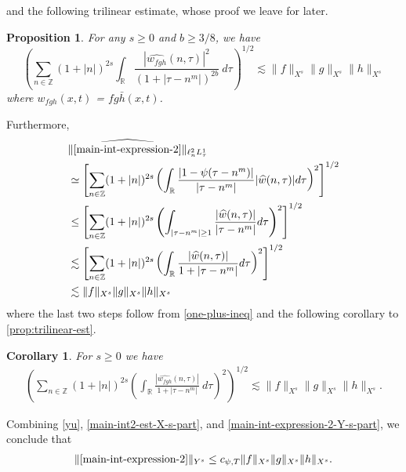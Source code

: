 \documentclass[12pt,reqno]{amsart}
\numberwithin{equation}{section}  %
\numberwithin{figure}{section}
\newcommand{\rr}{\mathbb{R}}
\newcommand{\zz}{\mathbb{Z}}
\newcommand{\wh}{\widehat}
\theoremstyle{plain}
\newtheorem{proposition}{Proposition}
\newtheorem{corollary}{Corollary}
\theoremstyle{definition}
\theoremstyle{remark}
\begin{document}
%
%
and the following trilinear estimate, whose proof we leave for later.
%
%
%
%
%
%
%
%
\begin{proposition}
\label{prop:trilinear-est}
	For any $s \ge 0$ and $b \ge 3/8$, we have
	\begin{equation}
		\left( \sum_{n \in \zz} \left (1 + |n| \right )^{2s} \int_\rr
		\frac{|\wh{w_{fgh}}(n, \tau) |^2}{\left (1+ |\tau - 
    n^{m}| \right )^{2b}} 
		 \ d \tau 
		\right)^{1/2}
		\lesssim \|f\|_{X^s} \|g\|_{X^s}\|h\|_{X^s}
	\end{equation}
	where $w_{fgh}(x,t)$ = $fg \bar h (x,t)$.
%
%
%
%
\end{proposition}
%
%
Furthermore,
%
%
%
%
\begin{equation}
	\label{main-int-expression-2-Y-s-part}
	\begin{split}
    & \| \wh{\eqref{main-int-expression-2}}\|_{\ell^{2}_{n}L^{1}_{\tau}}
		\\
    & \simeq \left[ \sum_{n \in \zz}(1 + | n |)^{2s} \left(
		\int_{\rr}\frac{|1 - \psi(\tau - n^{m})|}{|\tau - n^{m}|} |\wh{w}(n, \tau)| d
		\tau \right)^{2} \right]^{1/2}
		\\
    & \le \left[ \sum_{n \in \zz}(1 + | n |)^{2s} \left(
    \int_{| \tau - n^{m} | \ge 1 }\frac{|\wh{w}(n, \tau)|}{|\tau - n^{m}|}  d
		\tau \right)^{2} \right]^{1/2}
    \\
    & \lesssim \left[ \sum_{n \in \zz}(1 + | n |)^{2s} \left(
    \int_{\rr}\frac{|\wh{w}(n, \tau)|}{1 + |\tau - n^{m}|}  d
		\tau \right)^{2} \right]^{1/2}
    \\
		& \lesssim \|f\|_{X^s} \|g\|_{X^s}\|h\|_{X^s}
	\end{split}
\end{equation}
%
%
where the last two steps follow from \eqref{one-plus-ineq} and the following
corollary to \autoref{prop:trilinear-est}.
%
%
%
%
%
%
%
%
\begin{corollary}
\label{cor:trilinear-estimate2}
	For $s \ge 0$ we have
%
%
\begin{equation}
	\label{trilinear-estimate2}
	\begin{split}
		\left( \sum_{n \in \zz} \left (1 + |n| \right )^{2s}  \left ( \int_\rr 
		\frac{|\wh{w_{fgh}}(n, \tau) |}{1 + | \tau - n^{m } |}
		 \ d\tau \right)^2  \right)^{1/2} \lesssim \|f\|_{X^s} \|g\|_{X^s}\|h\|_{X^s}.
	\end{split}
\end{equation}
\end{corollary}
%
%
Combining \eqref{yu}, \eqref{main-int2-est-X-s-part}, and
\eqref{main-int-expression-2-Y-s-part}, we conclude that
%
%
%
%
\begin{equation}
	\label{main-int2-est}
	\begin{split}
		\|\eqref{main-int-expression-2}\|_{Y^s} \le c_{\psi, T}\|f\|_{X^s} \|g\|_{X^s}\|h\|_{X^s}.
	\end{split}
\end{equation}
%
%
\end{document}
